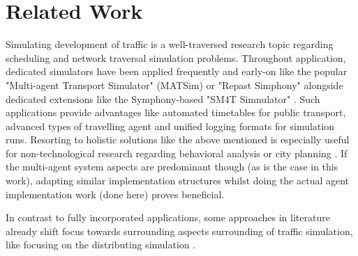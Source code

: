 \section{Related Work}\label{sec:relatedWork}

Simulating development of traffic is a well-traversed research topic regarding scheduling and network traversal simulation problems.
Throughout application, dedicated simulators have been applied frequently and early-on like the popular "Multi-agent Transport Simulator" (MATSim) \cite{sezen2003modeling} or "Repast Simphony" \cite{zargayouna2013agent} alongside dedicated extensions like the Symphony-based "SM4T Simnulator" \cite{ksontini2016building}.
Such applications provide advantages like automated timetables for public transport, advanced types of travelling agent and unified logging formats for simulation runs.
Resorting to holistic solutions like the above mentioned is especially useful for non-technological research regarding behavioral analysis or city planning \cite{brakewood2018literature}. If the multi-agent system aspects are predominant though (as is the case in this work), adapting similar implementation structures whilst doing the actual agent implementation work (done here) proves beneficial.

In contrast to fully incorporated applications, some approaches in literature already shift focus towards surrounding aspects surrounding of traffic simulation, like focusing on the distributing simulation \cite{mastio2015towards}.

\lipsum[1]

\lipsum[2]
\lipsum[3]
\lipsum[4]

\lipsum[5]
\lipsum[6]
\lipsum[7]
\lipsum[8]




